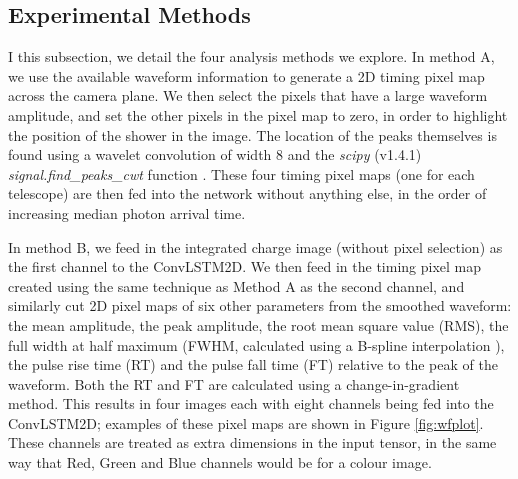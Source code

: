 \subsection{Experimental Methods}
I this subsection, we detail the four analysis methods we explore. In method A, we use the available waveform information to generate a 2D timing pixel map across the camera plane. We then select the pixels that have a large waveform amplitude, and set the other pixels in the pixel map to zero, in order to highlight the position of the shower in the image. The location of the peaks themselves is found using a wavelet convolution of width 8 and the \textit{scipy} (v1.4.1) \textit{signal.find\_peaks\_cwt} function \cite{scipy}\cite{findpeaks}. These four timing pixel maps (one for each telescope) are then fed into the network without anything else, in the order of increasing median photon arrival time.

In method B, we feed in the integrated charge image (without pixel selection) as the first channel to the ConvLSTM2D. We then feed in the timing pixel map created using the same technique as Method A as the second channel, and similarly cut 2D pixel maps of six other parameters from the smoothed waveform: the mean amplitude, the peak amplitude, the root mean square value (RMS), the full width at half maximum (FWHM, calculated using a B-spline interpolation \cite{scipy}), the pulse rise time (RT) and the pulse fall time (FT) relative to the peak of the waveform. Both the RT and FT are calculated using a change-in-gradient method. This results in four images each with eight channels being fed into the ConvLSTM2D; examples of these pixel maps are shown in Figure \ref{fig:wfplot}. These channels are treated as extra dimensions in the input tensor, in the same way that Red, Green and Blue channels would be for a colour image.

